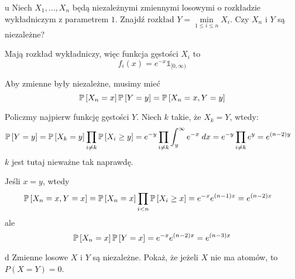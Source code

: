 \documentclass{article}
\begin{document}
\begin{problem}[4]{u}
Niech $X_1,...,X_n$ będą niezależnymi zmiennymi losowymi o rozkładzie wykładniczym z parametrem $1$. Znajdź rozkład $Y=\min\limits_{1\leq i\leq n}X_i$. Czy $X_n$ i $Y$ są niezależne?
\end{problem}


Mają rozkład wykładniczy, więc funkcja gęstości $X_i$ to
$$f_i(x)=e^{-x}\mathds{1}_{[0,\infty)}$$


Aby zmienne były niezależne, musimy mieć
$$\prob{X_n= x}\prob{Y = y}=\prob{X_n = x, Y = y}$$

Policzmy najpierw funkcję gęstości $Y$. Niech $k$ takie, że $X_k=Y$, wtedy:
\begin{align*}
    \prob{Y=y}&=\prob{X_k=y}\prod_{i\neq k}\prob{X_i\geq y}=e^{-y}\prod_{i\neq k}\int_y^\infty e^{-x}\;dx=e^{-y}\prod_{i\neq k}e^y=e^{(n-2)y}
\end{align*}
$k$ jest tutaj nieważne tak naprawdę.

%
Jeśli $x=y$, wtedy
    \begin{align*}
        \prob{X_n=x, Y=x}&=\prob{X_n=x}\prod_{i<n}\prob{X_i\geq x}=e^{-x}e^{(n-1)x}=e^{(n-2)x}
    \end{align*}
    ale 
    $$\prob{X_n=x}\prob{Y=x}=e^{-x}e^{(n-2)x}=e^{(n-3)x}$$






\begin{problem}[5]{d}
Zmienne losowe $X$ i $Y$ są niezależne. Pokaż, że jeżeli $X$ nie ma atomów, to $P(X=Y)=0$.
\end{problem}
\end{document}
